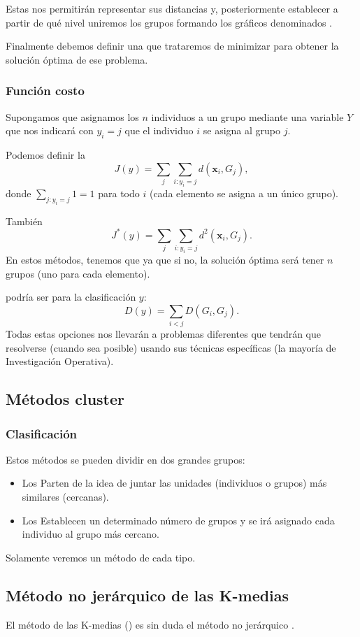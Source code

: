 Estas  nos permitirán representar sus distancias y, posteriormente establecer a partir de qué nivel uniremos los grupos formando los gráficos denominados .

Finalmente debemos definir una  que trataremos de minimizar para obtener la solución óptima de ese problema.
\subsubsection{Función costo}
Supongamos que asignamos los $n$ individuos a un grupo mediante una variable $Y$ que nos indicará con $y_i=j$ que el individuo $i$ se asigna al grupo $j$.

Podemos definir la  \[ J(y)=\sum_j\sum_{i:y_i=j}d(\mathbf{x}_i,G_j), \]donde $\sum_{j:y_i=j}1=1$ para todo $i$ (cada elemento se asigna a un único grupo).

También  \[ J^*(y)=\sum_j\sum_{i:y_i=j}d^2(\mathbf{x}_i,G_j). \]
En estos métodos, tenemos que  ya que si no, la solución óptima será tener $n$ grupos (uno para cada elemento).

 podría ser  para la clasificación $y$: \[ D(y)=\sum_{i<j}D(G_i,G_j). \]
Todas estas opciones nos llevarán a problemas diferentes que tendrán que resolverse (cuando sea posible) usando sus técnicas específicas (la mayoría de Investigación Operativa).
\subsection{Métodos cluster}
\subsubsection{Clasificación}
Estos métodos se pueden dividir en dos grandes grupos:
\begin{itemize}
\item Los  Parten de la idea de juntar las unidades (individuos o grupos) más similares (cercanas).
\item Los  Establecen un determinado número de grupos y se irá asignado cada individuo al grupo más cercano.
\end{itemize}
Solamente veremos un método de cada tipo.
\subsection{Método no jerárquico de las K-medias}
El método de las K-medias () es sin duda el método no jerárquico .

